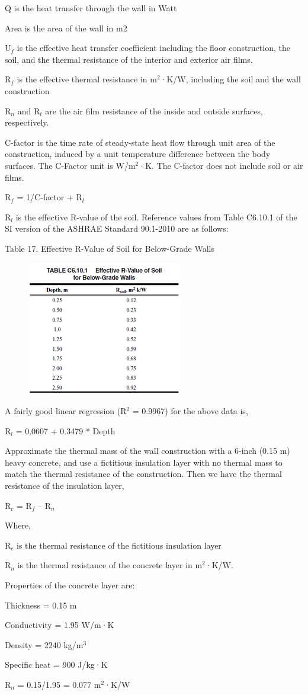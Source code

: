 Q is the heat transfer through the wall in Watt

Area is the area of the wall in m2

U\(_{f}\) is the effective heat transfer coefficient including the floor construction, the soil, and the thermal resistance of the interior and exterior air films.

R\(_{f}\) is the effective thermal resistance in m\(^{2}\)·K/W, including the soil and the wall construction

R\(_{n}\) and R\(_{t}\) are the air film resistance of the inside and outside surfaces, respectively.

C-factor is the time rate of steady-state heat flow through unit area of the construction, induced by a unit temperature difference between the body surfaces. The C-Factor unit is W/m\(^{2}\)·K. The C-factor does not include soil or air films.

R\(_{f}\) = 1/C-factor + R\(_{l}\) \(_{ }\)

R\(_{l}\) is the effective R-value of the soil. Reference values from Table C6.10.1 of the SI version of the ASHRAE Standard 90.1-2010 are as follows:

Table 17. Effective R-Value of Soil for Below-Grade Walls

\begin{figure}[htbp]
\centering
\includegraphics{media/image436.png}
\caption{}
\end{figure}

A fairly good linear regression (R\(^{2}\) = 0.9967) for the above data is,

R\(_{l}\) = 0.0607 + 0.3479 * Depth

Approximate the thermal mass of the wall construction with a 6-inch (0.15 m) heavy concrete, and use a fictitious insulation layer with no thermal mass to match the thermal resistance of the construction. Then we have the thermal resistance of the insulation layer,

R\(_{c}\) = R\(_{f}\) -- R\(_{n}\)

Where,

R\(_{c}\) is the thermal resistance of the fictitious insulation layer

R\(_{n}\) is the thermal resistance of the concrete layer in m\(^{2}\)·K/W.

Properties of the concrete layer are:

Thickness = 0.15 m

Conductivity = 1.95 W/m·K

Density = 2240 kg/m\(^{3}\)

Specific heat = 900 J/kg·K

R\(_{n}\) = 0.15/1.95 = 0.077 m\(^{2}\)·K/W
